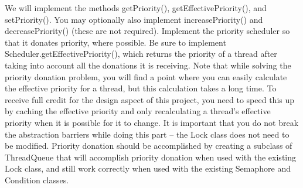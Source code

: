 \documentclass[a4paper,10pt]{article}
\begin{document}
We will implement the methods getPriority(), getEffectivePriority(), and setPriority(). You may optionally also implement increasePriority() and decreasePriority() (these are not required). 
Implement the priority scheduler so that it donates priority, where possible. Be sure to implement Scheduler.getEffectivePriority(), which returns the priority of a thread after taking into account all the donations it is receiving.
Note that while solving the priority donation problem, you will find a point where you can easily calculate the effective priority for a thread, but this calculation takes a long time. To receive full credit for the design aspect of this project, you need to speed this up by caching the effective priority and only recalculating a thread's effective priority when it is possible for it to change.
It is important that you do not break the abstraction barriers while doing this part -- the Lock class does not need to be modified. Priority donation should be accomplished by creating a subclass of ThreadQueue that will accomplish priority donation when used with the existing Lock class, and still work correctly when used with the existing Semaphore and Condition classes.
\end{document}
